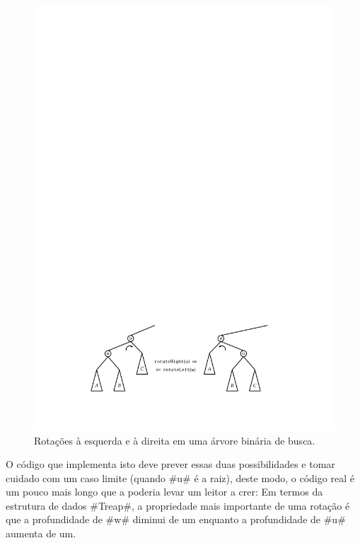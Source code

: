 \begin{figure}
  \begin{center}
     \includegraphics[width=\ScaleIfNeeded]{figs/rotation}
  \end{center}
  \caption{Rotações à esquerda e à direita em uma árvore binária de busca.}
\end{figure}

O código que implementa isto deve prever essas duas possibilidades e
tomar cuidado com um caso limite (quando #u# é a raiz), deste modo, o código real
é um pouco mais longo que a  poderia levar um leitor a crer:
\label{page:rotations}
Em termos da estrutura de dados #Treap#, a propriedade mais importante de uma
rotação é que a profundidade de #w# diminui de um enquanto a profundidade de #u#
aumenta de um.

